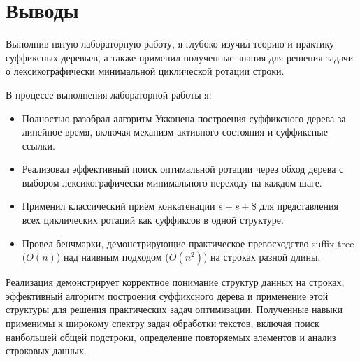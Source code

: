 \section{Выводы}

Выполнив пятую лабораторную работу, я глубоко изучил теорию и практику суффиксных деревьев, а также применил полученные знания для решения задачи о лексикографически минимальной циклической ротации строки.

В процессе выполнения лабораторной работы я:

\begin{itemize}
    \item Полностью разобрал алгоритм Укконена построения суффиксного дерева за линейное время, включая механизм активного состояния и суффиксные ссылки.

    \item Реализовал эффективный поиск оптимальной ротации через обход дерева с выбором лексикографически минимального переходу на каждом шаге.

    \item Применил классический приём конкатенации $s + s + \$$ для представления всех циклических ротаций как суффиксов в одной структуре.

    \item Провел бенчмарки, демонстрирующие практическое превосходство suffix tree ($O(n)$) над наивным подходом ($O(n^2)$) на строках разной длины.
\end{itemize}

Реализация демонстрирует корректное понимание структур данных на строках, эффективный алгоритм построения суффиксного дерева и применение этой структуры для решения практических задач оптимизации. Полученные навыки применимы к широкому спектру задач обработки текстов, включая поиск наибольшей общей подстроки, определение повторяемых элементов и анализ строковых данных.

\pagebreak
